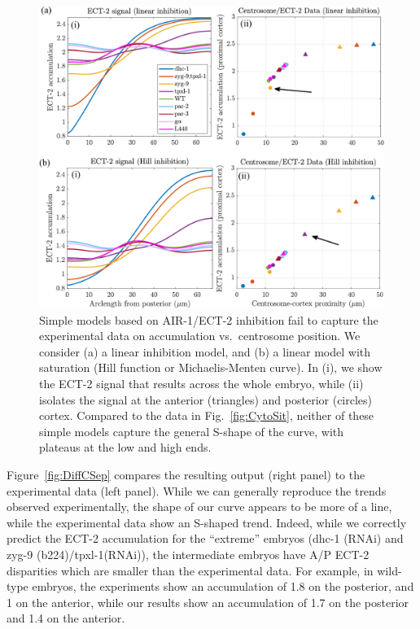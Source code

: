 \documentclass[11pt]{article}
\begin{document}
\begin{figure}
\centering
\includegraphics[width=\textwidth]{Glotzer/Fig3/Fig3-crop.pdf}
\caption{\label{fig:LinFail}Simple models based on AIR-1/ECT-2 inhibition fail to capture the experimental data on accumulation vs.\ centrosome position. We consider (a) a linear inhibition model, and (b) a linear model with saturation (Hill function or Michaelis-Menten curve). In (i), we show the ECT-2 signal that results across the whole embryo, while (ii) isolates the signal at the anterior (triangles) and posterior (circles) cortex. Compared to the data in Fig.\ \ref{fig:CytoSit}, neither of these simple models capture the general S-shape of the curve, with plateaus at the low and high ends. }
\end{figure}

Figure\ \ref{fig:DiffCSep} compares the resulting output (right panel) to the experimental data (left panel). While we can generally reproduce the trends observed experimentally, the shape of our curve appears to be more of a line, while the experimental data show an S-shaped trend. Indeed, while we correctly predict the ECT-2 accumulation for the ``extreme'' embryos (dhc-1 (RNAi) and zyg-9 (b224)/tpxl-1(RNAi)), the intermediate embryos have A/P ECT-2 disparities which are smaller than the experimental data. For example, in wild-type embryos, the experiments show an accumulation of 1.8 on the posterior, and 1 on the anterior, while our results show an accumulation of 1.7 on the posterior and 1.4 on the anterior. 
\end{document}
